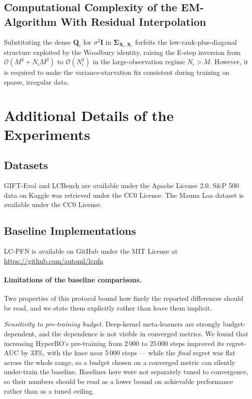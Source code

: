 \documentclass{article}
\begin{document}
\subsection{Computational Complexity of the EM-Algorithm With Residual Interpolation}

Substituting the dense $\mathbf{Q}_i$ for $\sigma^2\mathbf{I}$ in
$\boldsymbol{\Sigma}_{\mathbf{X}_i,\mathbf{X}_i}$ forfeits the
low-rank-plus-diagonal structure exploited by the Woodbury identity, raising the
E-step inversion from $\mathcal{O}(M^3 + N_iM^2)$ to $\mathcal{O}(N_i^3)$ in the
large-observation regime $N_i > M$.
However, it is required to make the variance-starvation fix
consistent during training on sparse, irregular data.

\section{Additional Details of the Experiments}

\subsection{Datasets}
GIFT-Eval and LCBench are available under the Apache License 2.0. S\&P 500 data on Kaggle was retrieved under the CC0 License. The Mauna Loa dataset is available under the CC0 License.

\subsection{Baseline Implementations}
LC-PFN is available on GitHub under the MIT License at \url{https://github.com/automl/lcpfn}

\paragraph{Limitations of the baseline comparisons.}
Two properties of this protocol bound how finely the reported differences should be
read, and we state them explicitly rather than leave them implicit.

\emph{Sensitivity to pre-training budget.} Deep-kernel meta-learners are strongly
budget-dependent, and the dependence is not visible in converged metrics.
We found that increasing HyperBO's pre-training from $2\,000$ to $25\,000$ steps improved its
regret-AUC by $33\%$, with the knee near $5\,000$ steps --- while the
\emph{final} regret was flat across the whole range, so a budget chosen on a
converged metric can silently under-train the baseline. Baselines here were not
separately tuned to convergence, so their numbers should be read as a lower bound
on achievable performance rather than as a tuned ceiling.
\end{document}
